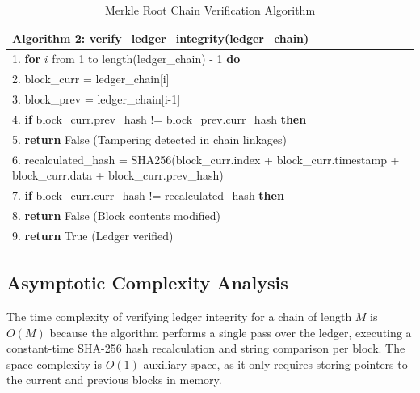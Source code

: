 \documentclass[12pt,a4paper,oneside]{report}
\begin{document}
\begin{table}[htbp]
\caption{Merkle Root Chain Verification Algorithm}
\centering
\small
{}
\begin{tabular}{p{5.5in}}
\hline
\textbf{Algorithm 2: verify\_ledger\_integrity(ledger\_chain)} \\ \hline
1. \textbf{for} $i$ from 1 to length(ledger\_chain) - 1 \textbf{do} \\
2. \quad block\_curr = ledger\_chain[i] \\
3. \quad block\_prev = ledger\_chain[i-1] \\
4. \quad \textbf{if} block\_curr.prev\_hash != block\_prev.curr\_hash \textbf{then} \\
5. \quad\quad \textbf{return} False (Tampering detected in chain linkages) \\
6. \quad recalculated\_hash = SHA256(block\_curr.index + block\_curr.timestamp + block\_curr.data + block\_curr.prev\_hash) \\
7. \quad \textbf{if} block\_curr.curr\_hash != recalculated\_hash \textbf{then} \\
8. \quad\quad \textbf{return} False (Block contents modified) \\
9. \textbf{return} True (Ledger verified) \\ \hline
\end{tabular}
\label{tab:merkle_verification}
\end{table}

\subsection{Asymptotic Complexity Analysis}
The time complexity of verifying ledger integrity for a chain of length $M$ is $O(M)$ because the algorithm performs a single pass over the ledger, executing a constant-time SHA-256 hash recalculation and string comparison per block. The space complexity is $O(1)$ auxiliary space, as it only requires storing pointers to the current and previous blocks in memory.
\end{document}
